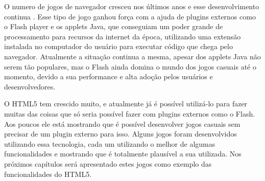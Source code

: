 O numero de jogos de navegador cresceu nos últimos anos e esse
desenvolvimento continua \cite{ozcan2010recent}. Esse tipo de jogo
ganhou força com a ajuda de plugins externos como o Flash player e
os applets Java, que conseguiam um poder grande de processamento para
recursos da internet da época, utilizando uma extensão instalada no
computador do usuário para executar código que chega pelo navegador.
Atualmente a situação continua a mesma, apesar dos applets Java não
serem tão populares, mas o Flash ainda domina o mundo dos jogos
casuais até o momento, devido a sua performance e alta adoção pelos
usuários e desenvolvedores.

O HTML5 tem crescido muito, e atualmente já é possível utilizá-lo
para fazer muitas das coisas que só seria possível fazer com plugins
externos como o Flash. Aos poucos ele está mostrando que é possível
desenvolver jogos casuais sem precisar de um plugin externo para isso.
Alguns jogos foram desenvolvidos utilizando essa tecnologia, cada um
utilizando o melhor de algumas funcionalidades e mostrando que é
totalmente plausível a sua utilizada. Nos próximos capítulos será
apresentado estes jogos como exemplo das funcionalidades do HTML5.
